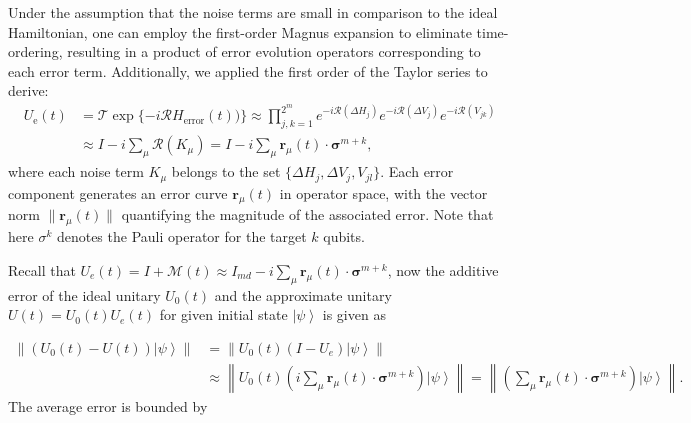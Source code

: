 \documentclass[12pt]{article}
\newcommand{\ket}[1]{\left|#1\right\rangle}
\newcommand{\norm}[1]{\left\lVert #1\right\rVert}
\begin{document}
Under the assumption that the noise terms are small in comparison to the ideal Hamiltonian, one can employ the first-order Magnus expansion to eliminate time-ordering, resulting in a product of error evolution operators corresponding to each error term. Additionally, we applied the first order of the Taylor series to derive:
\begin{equation}
\begin{aligned}
U_{\text{e}}(t) &=\mathcal{T} \exp\{-i \mathcal{R} H_{\text{error}}(t))\}\approx \prod_{j,k=1}^{2^m}e^{-i\mathcal{R}(\Delta H_j)}e^{-i\mathcal{R}(\Delta V_j)}e^{-i\mathcal{R}(V_{jk})}\\
&\approx I - i\sum_{\mu} \mathcal{R}(K_\mu)=I - i\sum_{\mu}\mathbf{r}_\mu(t)\cdot \boldsymbol{\sigma}^{m+k},
\end{aligned}
\label{Eq_GeneralUe}
\end{equation}
where each noise term $K_\mu$ belongs to the set $\{\Delta H_j,\Delta V_j, V_{jl} \}$. Each error component generates an error curve $\mathbf{r}_\mu(t)$ in operator space, with the vector norm $\|\mathbf{r}_\mu(t)\|$ quantifying the magnitude of the associated error. Note that here $\sigma^k$ denotes the Pauli operator for the target $k$ qubits. 

Recall that $U_e(t)=I+\mathscr{M}(t)\approx I_{md} - i\sum_{\mu}\mathbf{r}_\mu(t)\cdot \boldsymbol{\sigma}^{m+k}$, now the additive error of the ideal unitary $U_0(t)$ and the approximate unitary $U(t)=U_0(t)U_e(t)$ for given initial state $\ket{\psi}$ is given as

\begin{equation}
\begin{split}
       \norm{ (U_0(t)-U(t))\ket{\psi}}&= \norm{U_0(t) (I-U_e)\ket{\psi}}\\
        &\approx
        \norm{U_0(t)(i\sum_{\mu}\mathbf{r}_\mu(t)\cdot \boldsymbol{\sigma}^{m+k}) \ket{\psi}}=\norm{(\sum_{\mu}\mathbf{r}_\mu(t)\cdot \boldsymbol{\sigma}^{m+k}) \ket{\psi}}.
\end{split}
\end{equation}
The average error is bounded by
\end{document}
